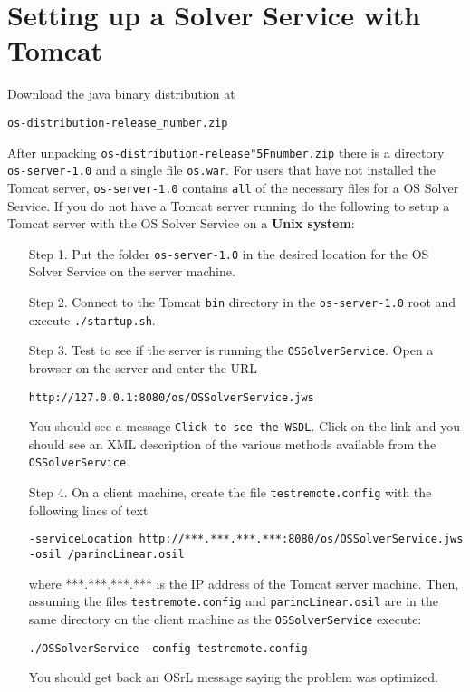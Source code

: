\documentclass[11pt]{article}
\renewcommand{\_}{{\char"5F}}
\renewcommand{\{}{{\char"7B}}
\renewcommand{\}}{{\char"7D}}
\renewcommand{\^}{{\char"0D}}
\renewcommand{\'}{{\char"0D}}
\begin{document}
\section{Setting up a Solver Service with Tomcat}\label{section:tomcat}

Download the java binary distribution at
\begin{verbatim}
os-distribution-release_number.zip
\end{verbatim}

After unpacking {\tt os-distribution-release\_number.zip} there is a directory {\tt os-server-1.0} and a single file {\tt os.war}.  For users that have not installed the Tomcat server,   {\tt os-server-1.0} contains {\tt all} of the necessary files for a OS Solver Service.  If you do not have a Tomcat server running do the following to setup a  Tomcat server  with the OS Solver Service on a {\bf Unix system}:

\begin{itemize}
\item[Step 1.]  Put the folder  {\tt os-server-1.0}   in the desired location for the OS Solver Service on the server machine. 

\item[Step 2.] Connect to the Tomcat {\tt bin} directory in the {\tt os-server-1.0} root and execute {\tt ./startup.sh}. 

\item[Step 3.] Test to see if the server is running the {\tt OSSolverService}.  Open a browser on the server and enter the URL
\begin{verbatim}
http://127.0.0.1:8080/os/OSSolverService.jws
\end{verbatim}
You should see a message {\tt Click to see the WSDL}.  Click on the link and you should see an XML description of the various methods available from the {\tt OSSolverService}.

\item[Step 4.]  On a client machine, create  the file {\tt testremote.config} with the following lines of text
\begin{verbatim}
-serviceLocation http://***.***.***.***:8080/os/OSSolverService.jws
-osil /parincLinear.osil
\end{verbatim}
where ***.***.***.*** is the IP address of the Tomcat server machine. Then, assuming the files {\tt testremote.config} and {\tt parincLinear.osil} are in the same directory on the client machine as the {\tt OSSolverService} execute:
\begin{verbatim}
./OSSolverService -config testremote.config
\end{verbatim}
You should get back an OSrL message saying the problem was optimized. 

\end{itemize}
\end{document}
